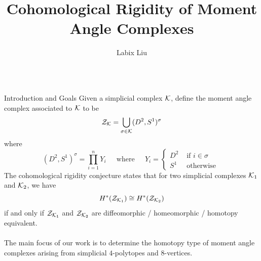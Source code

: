 \documentclass[final]{beamer}
\title{Cohomological Rigidity of Moment Angle Complexes}
\author{Labix Liu}
\institute[shortinst]{Queen Mary University of London}
\begin{document}
\begin{frame}[t]
\begin{columns}[t]
\separatorcolumn

\begin{column}{\colwidth}

  \begin{block}{Introduction and Goals}
Given a simplicial complex $\mathcal{K}$, define the moment angle complex associated to $\mathcal{K}$ to be $$\mathcal{Z}_{\mathcal{K}}=\bigcup_{\sigma\in\mathcal{K}}(D^2,S^1)^\sigma$$ where $$(D^2,S^1)^\sigma=\prod_{i=1}^nY_i\;\;\;\;\text{ where }\;\;\;\;Y_i=\begin{cases}
D^2 & \text{ if }i\in\sigma\\
S^1 & \text{ otherwise }
\end{cases}$$ The cohomological rigidity conjecture states that for two simplicial complexes $\mathcal{K}_1$ and $\mathcal{K}_2$, we have $$H^\ast(\mathcal{Z}_{\mathcal{K}_1})\cong H^\ast(\mathcal{Z}_{\mathcal{K}_2})$$ if and only if $\mathcal{Z}_{\mathcal{K}_1}$ and $\mathcal{Z}_{\mathcal{K}_2}$ are diffeomorphic / homeomorphic / homotopy equivalent. \\~\\

The main focus of our work is to determine the homotopy type of moment angle complexes arising from simplicial $4$-polytopes and $8$-vertices. 
  \end{block}


\end{column}
\end{columns}
\end{frame}
\end{document}
